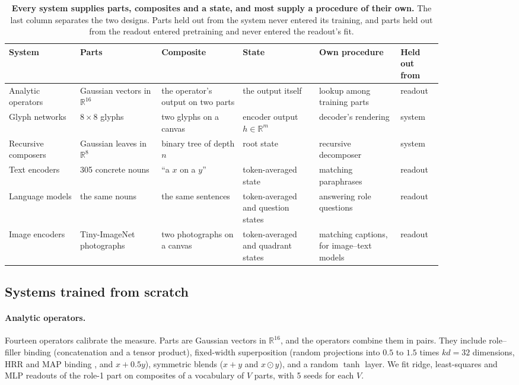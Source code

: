 \documentclass[10pt]{article}
\theoremstyle{plain}
\theoremstyle{remark}
\newcommand{\R}{\mathbb{R}}
\begin{document}
\begin{table}[t]
  \centering
  \small
  \caption{\textbf{Every system supplies parts, composites and a state, and most supply a procedure of their own.} The last column separates the two designs. Parts held out from the system never entered its training, and parts held out from the readout entered pretraining and never entered the readout's fit.}
  \label{tab:systems}
  \begin{tabular}{@{}p{0.14\linewidth}p{0.16\linewidth}p{0.16\linewidth}p{0.15\linewidth}p{0.16\linewidth}p{0.08\linewidth}@{}}
    \toprule
    System & Parts & Composite & State & Own procedure & Held out from \\
    \midrule
    Analytic operators & Gaussian vectors in $\R^{16}$ & the operator's output on two parts & the output itself & lookup among training parts & readout \\
    Glyph networks & $8 \times 8$ glyphs & two glyphs on a canvas & encoder output $h \in \R^m$ & decoder's rendering & system \\
    Recursive composers & Gaussian leaves in $\R^8$ & binary tree of depth $n$ & root state & recursive decomposer & system \\
    Text encoders & 305 concrete nouns & ``a $x$ on a $y$'' & token-averaged state & matching paraphrases & readout \\
    Language models & the same nouns & the same sentences & token-averaged and question states & answering role questions & readout \\
    Image encoders & Tiny-ImageNet photographs & two photographs on a canvas & token-averaged and quadrant states & matching captions, for image--text models & readout \\
    \bottomrule
  \end{tabular}
\end{table}

\subsection{Systems trained from scratch}
\label{sec:design_scratch}

\paragraph{Analytic operators.} Fourteen operators calibrate the measure. Parts are Gaussian vectors in $\R^{16}$, and the operators combine them in pairs. They include role--filler binding (concatenation and a tensor product), fixed-width superposition (random projections into $0.5$ to $1.5$ times $kd = 32$ dimensions, HRR and MAP binding \citep{plate1995,gayler2006,kanerva2009}, and $x + 0.5y$), symmetric blends ($x + y$ and $x \odot y$), and a random $\tanh$ layer. We fit ridge, least-squares and MLP readouts of the role-1 part on composites of a vocabulary of $V$ parts, with 5 seeds for each $V$.
\end{document}
